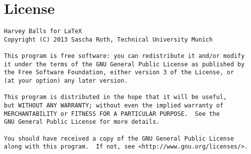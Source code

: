 \documentclass{article}%
\begin{document}
\section{License}
\begin{verbatim}
Harvey Balls for LaTeX
Copyright (C) 2013 Sascha Roth, Technical University Munich

This program is free software: you can redistribute it and/or modify
it under the terms of the GNU General Public License as published by
the Free Software Foundation, either version 3 of the License, or
(at your option) any later version.

This program is distributed in the hope that it will be useful,
but WITHOUT ANY WARRANTY; without even the implied warranty of
MERCHANTABILITY or FITNESS FOR A PARTICULAR PURPOSE.  See the
GNU General Public License for more details.

You should have received a copy of the GNU General Public License
along with this program.  If not, see <http://www.gnu.org/licenses/>.
\end{verbatim}


\end{document}
